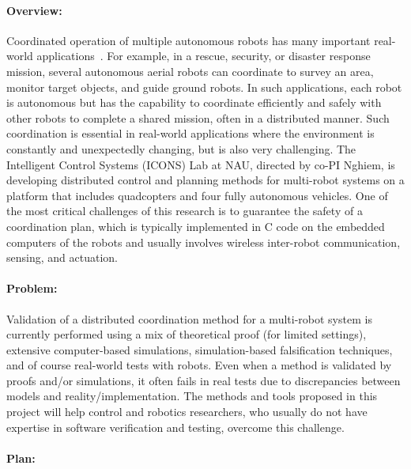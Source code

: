 
\paragraph{Overview:}

Coordinated operation of multiple autonomous robots %
has many important real-world applications~\cite{multirobot2005,multirobotsurvey2013}.
For example, in a rescue, security, or disaster response mission, several autonomous aerial robots can coordinate to survey an area, monitor target objects, %
and guide ground robots. %
In such applications, each robot is autonomous but has the capability to coordinate efficiently and safely with other robots to complete a shared mission, often in a distributed manner. %
Such coordination is essential in real-world applications where the environment is constantly and unexpectedly changing, but is also very challenging.
The Intelligent Control Systems (ICONS) Lab at NAU, directed by co-PI Nghiem, is developing distributed control and planning methods for multi-robot systems on a platform that includes quadcopters and four fully autonomous vehicles.
One of the most critical challenges of this research is to guarantee the safety of a coordination plan, which is typically implemented in C code on the embedded computers of the robots and usually involves wireless inter-robot communication, sensing, and actuation.

\paragraph{Problem:}

Validation of a distributed coordination method for a multi-robot system is currently performed using a mix of theoretical proof (for limited settings), extensive computer-based simulations, simulation-based falsification techniques, and of course real-world tests with robots.
Even when a method is validated by proofs and/or simulations, it often fails in real tests due to discrepancies between models and reality/implementation.
The methods and tools proposed in this project will help control and robotics researchers, who usually do not have expertise in software verification and testing, overcome this challenge.


\paragraph{Plan:}


